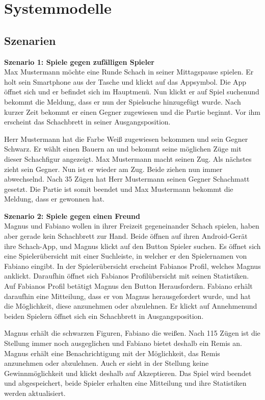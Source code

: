 \documentclass[parskip=full]{scrartcl}
\begin{document}
\section{Systemmodelle}
\subsection{Szenarien}
\textbf{Szenario 1: \glqq Spiele gegen zufälligen Spieler\grqq} \\
Max Mustermann möchte eine Runde Schach in seiner Mittagspause spielen. Er holt sein Smartphone aus der Tasche und klickt auf das Appsymbol.
Die App öffnet sich und er befindet sich im Hauptmenü. Nun klickt er auf \glqq Spiel suchen\grqq und bekommt die Meldung, dass er nun der Spielsuche hinzugefügt wurde.
Nach kurzer Zeit bekommt er einen Gegner zugewiesen und die Partie beginnt. Vor ihm erscheint das \gls{Schachbrett} in seiner \gls{Ausgangsposition}.

Herr Mustermann hat die Farbe Weiß zugewiesen bekommen und sein Gegner Schwarz. Er wählt einen Bauern an und bekommt seine möglichen Züge mit dieser \gls{Schachfigur} angezeigt.
Max Mustermann macht seinen Zug. Als nächstes zieht sein Gegner. Nun ist er wieder am Zug. Beide ziehen nun immer abwechselnd. Nach 35 Zügen hat Herr Mustermann
seinen Gegner \gls{Schachmatt} gesetzt. Die Partie ist somit beendet und Max Mustermann bekommt die Meldung, dass er gewonnen hat.

\textbf{Szenario 2: \glqq Spiele gegen einen Freund\grqq} \\
Magnus und Fabiano wollen in ihrer Freizeit gegeneinander Schach spielen, haben aber gerade kein Schachbrett zur Hand. Beide öffnen auf ihren \gls{Android}-Gerät ihre Schach-App, und Magnus klickt auf den Button \glqq Spieler suchen\grqq. Es öffnet sich eine Spielerübersicht mit einer Suchleiste, in welcher er den Spielernamen von Fabiano eingibt. In der Spielerübersicht erscheint Fabianos Profil, welches Magnus anklickt. Daraufhin öffnet sich Fabianos Profilübersicht mit seinen Statistiken. Auf Fabianos Profil betätigt Magnus den Button \glqq Herausfordern\grqq. Fabiano erhält daraufhin eine Mitteilung, dass er von Magnus herausgefordert wurde, und hat die Möglichkeit, diese anzunehmen oder abzulehnen. Er klickt auf \glqq Annehmen\grqq und beiden Spielern öffnet sich ein \gls{Schachbrett} in \gls{Ausgangsposition}.

Magnus erhält die schwarzen Figuren, Fabiano die weißen. Nach 115 Zügen ist die Stellung immer noch ausgeglichen und Fabiano bietet deshalb ein \gls{Remis} an. Magnus erhält eine Benachrichtigung mit der Möglichkeit, das \gls{Remis} anzunehmen oder abzulehnen. Auch er sieht in der Stellung keine Gewinnmöglichkeit und klickt deshalb auf \glqq Akzeptieren\grqq. Das Spiel wird beendet und abgespeichert, beide Spieler erhalten eine Mitteilung und ihre Statistiken werden aktualisiert.
\end{document}
